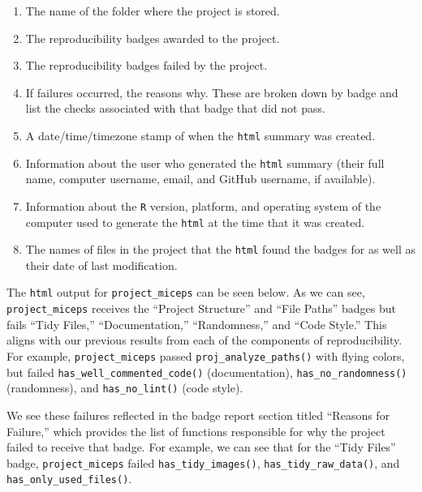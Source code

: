 \documentclass[12pt,twoside]{reedthesis}
\providecommand{\tightlist}{%
  \setlength{\itemsep}{0pt}\setlength{\parskip}{0pt}}
\begin{document}
\begin{enumerate}
\def\labelenumi{\arabic{enumi}.}
\tightlist
\item
  The name of the folder where the project is stored.
\item
  The reproducibility badges awarded to the project.
\item
  The reproducibility badges failed by the project.
\item
  If failures occurred, the reasons why. These are broken down by badge and list the checks associated with that badge that did not pass.
\item
  A date/time/timezone stamp of when the \texttt{html} summary was created.
\item
  Information about the user who generated the \texttt{html} summary (their full name, computer username, email, and GitHub username, if available).
\item
  Information about the \texttt{R} version, platform, and operating system of the computer used to generate the \texttt{html} at the time that it was created.
\item
  The names of files in the project that the \texttt{html} found the badges for as well as their date of last modification.
\end{enumerate}
The \texttt{html} output for \texttt{project\_miceps} can be seen below. As we can see, \texttt{project\_miceps} receives the ``Project Structure'' and ``File Paths'' badges but fails ``Tidy Files,'' ``Documentation,'' ``Randomness,'' and ``Code Style.'' This aligns with our previous results from each of the components of reproducibility. For example, \texttt{project\_miceps} passed \texttt{proj\_analyze\_paths()} with flying colors, but failed \texttt{has\_well\_commented\_code()} (documentation), \texttt{has\_no\_randomness()} (randomness), and \texttt{has\_no\_lint()} (code style).

We see these failures reflected in the badge report section titled ``Reasons for Failure,'' which provides the list of functions responsible for why the project failed to receive that badge. For example, we can see that for the ``Tidy Files'' badge, \texttt{project\_miceps} failed \texttt{has\_tidy\_images()}, \texttt{has\_tidy\_raw\_data()}, and \texttt{has\_only\_used\_files()}.
\end{document}
